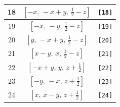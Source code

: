\documentclass[fleqn,8pt]{jsarticle}
\begin{document}
\begin{longtable}{ccc}
18 & $\left[ - x,\, - x + y,\, \frac{1}{2} - z \right]$ & {\tt [18]} \\ \hline
19 & $\left[ - x,\, - y,\, \frac{1}{2} - z \right]$ & {\tt [19]} \\ \hline
20 & $\left[ y,\, - x + y,\, \frac{1}{2} - z \right]$ & {\tt [20]} \\ \hline
21 & $\left[ x - y,\, x,\, \frac{1}{2} - z \right]$ & {\tt [21]} \\ \hline
22 & $\left[ - x + y,\, y,\, z + \frac{1}{2} \right]$ & {\tt [22]} \\ \hline
23 & $\left[ - y,\, - x,\, z + \frac{1}{2} \right]$ & {\tt [23]} \\ \hline
24 & $\left[ x,\, x - y,\, z + \frac{1}{2} \right]$ & {\tt [24]} \\
\end{longtable}
\end{document}
